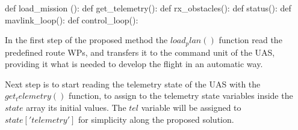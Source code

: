 \documentclass[a4paper, 11pt]{article}
\begin{document}
def load_mission ():
def get_telemetry(): 
def rx_obstacles(): 
def status(): 
def mavlink_loop(): 
def control_loop():


In the first step of the proposed method the $load_plan()$ function read the predefined route WPs, and transfers it to the command unit of the UAS, providing it what is needed to develop the flight in an automatic way. 

Next step is to start reading the telemetry state of the UAS with the $get_telemetry()$ function, to assign to the telemetry state variables inside the $state$ array its initial values. 
The $tel$ variable will be assigned to $state['telemetry']$ for simplicity along the proposed solution. 
\end{document}

